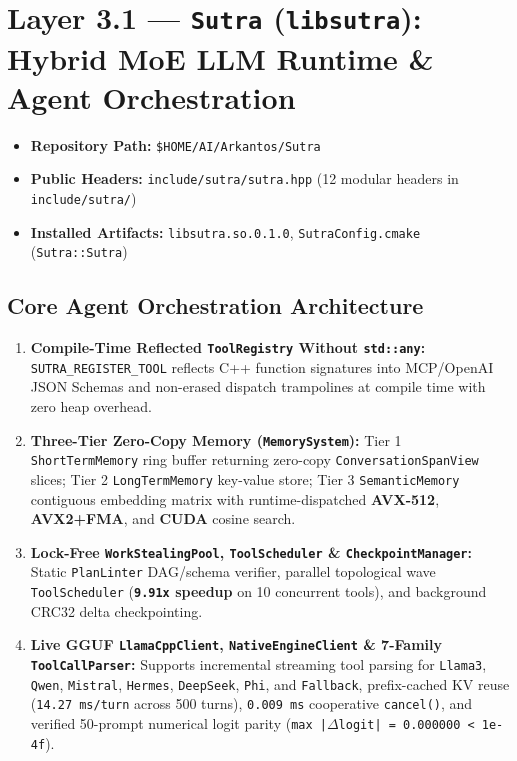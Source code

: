 \documentclass[11pt,a4paper]{article}
\begin{document}
\section{Layer 3.1 --- \texttt{Sutra} (\texttt{libsutra}): Hybrid MoE LLM Runtime \& Agent Orchestration}

\begin{itemize}[leftmargin=1.5em,itemsep=1pt]
  \item \textbf{Repository Path:} \texttt{\$HOME/AI/Arkantos/Sutra}
  \item \textbf{Public Headers:} \texttt{include/sutra/sutra.hpp} (12 modular headers in \texttt{include/sutra/})
  \item \textbf{Installed Artifacts:} \texttt{libsutra.so.0.1.0}, \texttt{SutraConfig.cmake} (\texttt{Sutra::Sutra})
\end{itemize}

\subsection{Core Agent Orchestration Architecture}
\begin{enumerate}[leftmargin=1.5em]
  \item \textbf{Compile-Time Reflected \texttt{ToolRegistry} Without \texttt{std::any}:} \texttt{SUTRA\_REGISTER\_TOOL} reflects C++ function signatures into MCP/OpenAI JSON Schemas and non-erased dispatch trampolines at compile time with zero heap overhead.
  \item \textbf{Three-Tier Zero-Copy Memory (\texttt{MemorySystem}):} Tier 1 \texttt{ShortTermMemory} ring buffer returning zero-copy \texttt{ConversationSpanView} slices; Tier 2 \texttt{LongTermMemory} key-value store; Tier 3 \texttt{SemanticMemory} contiguous embedding matrix with runtime-dispatched \textbf{AVX-512}, \textbf{AVX2+FMA}, and \textbf{CUDA} cosine search.
  \item \textbf{Lock-Free \texttt{WorkStealingPool}, \texttt{ToolScheduler} \& \texttt{CheckpointManager}:} Static \texttt{PlanLinter} DAG/schema verifier, parallel topological wave \texttt{ToolScheduler} (\textbf{\texttt{9.91x} speedup} on 10 concurrent tools), and background CRC32 delta checkpointing.
  \item \textbf{Live GGUF \texttt{LlamaCppClient}, \texttt{NativeEngineClient} \& 7-Family \texttt{ToolCallParser}:} Supports incremental streaming tool parsing for \texttt{Llama3}, \texttt{Qwen}, \texttt{Mistral}, \texttt{Hermes}, \texttt{DeepSeek}, \texttt{Phi}, and \texttt{Fallback}, prefix-cached KV reuse (\texttt{14.27 ms/turn} across 500 turns), \texttt{0.009 ms} cooperative \texttt{cancel()}, and verified 50-prompt numerical logit parity (\texttt{max |$\Delta$logit| = 0.000000 < 1e-4f}).
\end{enumerate}
\end{document}
